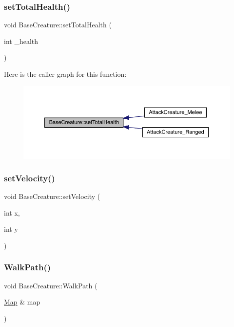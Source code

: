 \subsubsection{\texorpdfstring{set\+Total\+Health()}{setTotalHealth()}}
{\footnotesize\ttfamily void Base\+Creature\+::set\+Total\+Health (\begin{DoxyParamCaption}\item[{int}]{\+\_\+health }\end{DoxyParamCaption})}

Here is the caller graph for this function\+:
\nopagebreak
\begin{figure}[H]
\begin{center}
\leavevmode
\includegraphics[width=350pt]{d2/d3b/class_base_creature_a82f847585033035597700b071e40611f_icgraph}
\end{center}
\end{figure}
\mbox{\label{class_base_creature_ae1cb6e6d01d0c369433fb1fb20803f91}} 
\subsubsection{\texorpdfstring{set\+Velocity()}{setVelocity()}}
{\footnotesize\ttfamily void Base\+Creature\+::set\+Velocity (\begin{DoxyParamCaption}\item[{int}]{x,  }\item[{int}]{y }\end{DoxyParamCaption})}

\mbox{\label{class_base_creature_aaecab78bf5a5a5293079634e813f854f}} 
\subsubsection{\texorpdfstring{Walk\+Path()}{WalkPath()}}
{\footnotesize\ttfamily void Base\+Creature\+::\+Walk\+Path (\begin{DoxyParamCaption}\item[{\mbox{\hyperlink{class_map}{Map}} \&}]{map }\end{DoxyParamCaption})}

